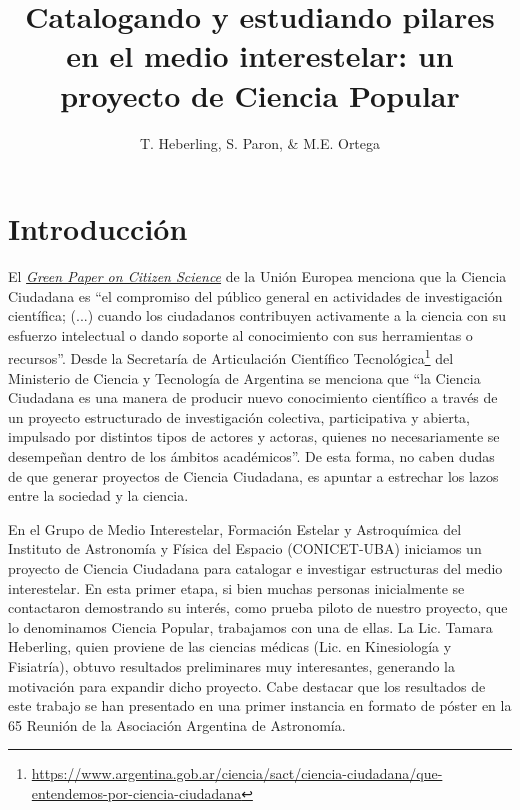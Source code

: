 \documentclass[baaa]{baaa}
\title{Catalogando y estudiando pilares en el medio interestelar: un proyecto
de Ciencia Popular}
\author{T. Heberling\inst{1},
S. Paron\inst{1},
\& M.E. Ortega\inst{1}
}
\institute{
Instituto de Astronomía y Física del Espacio, CONICET--UBA, Argentina
}
\begin{document}
\maketitle

\section{Introducción}

El \href{https://ec.europa.eu/newsroom/dae/document.cfm?doc_id=4122}{\it Green Paper on Citizen Science} de la Unión Europea menciona que la Ciencia Ciudadana es ``el compromiso del público general en actividades de investigación científica; (...) cuando los ciudadanos contribuyen activamente a la ciencia con su esfuerzo intelectual o dando soporte al conocimiento con sus herramientas o recursos''. 
Desde la Secretaría de Articulación Científico Tecnológica\footnote{\href{https://www.argentina.gob.ar/ciencia/sact/ciencia-ciudadana/que-entendemos-por-ciencia-ciudadana}{https://www.argentina.gob.ar/ciencia/sact/ciencia-ciudadana/que-entendemos-por-ciencia-ciudadana}} del Ministerio de Ciencia y Tecnología de Argentina se menciona que ``la Ciencia Ciudadana es una manera de producir nuevo conocimiento científico a través de un proyecto estructurado de investigación colectiva, participativa y abierta, impulsado por distintos tipos de actores y actoras, quienes no necesariamente se desempeñan dentro de los ámbitos académicos''. De esta forma, no caben dudas de que generar proyectos de Ciencia Ciudadana, es apuntar a estrechar los lazos entre la sociedad y la ciencia.

En el Grupo de Medio Interestelar, Formación Estelar y Astroquímica del Instituto de Astronomía y Física del Espacio (CONICET-UBA) iniciamos un proyecto de Ciencia Ciudadana para catalogar e investigar estructuras del medio interestelar. En esta primer etapa, si bien muchas personas inicialmente se contactaron demostrando su interés, como prueba piloto de nuestro proyecto, que lo denominamos Ciencia Popular, trabajamos con una de ellas. La Lic. Tamara Heberling, quien proviene de las ciencias médicas (Lic. en Kinesiología y Fisiatría), obtuvo resultados preliminares muy interesantes, generando la motivación para expandir dicho proyecto.
Cabe destacar que los resultados de este trabajo se han presentado en
una primer instancia en formato de póster en la 65 Reunión de la Asociación Argentina de Astronomía.
\end{document}
